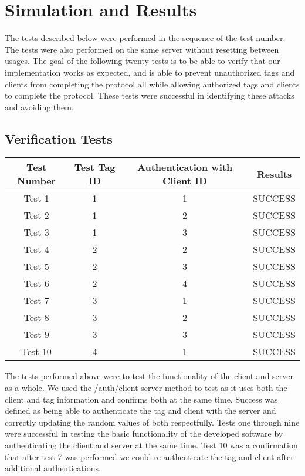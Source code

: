 \section{Simulation and Results}

The tests described below were performed in the sequence of the test number. The tests were also performed on the same server without resetting between usages. The goal of the following twenty tests is to be able to verify that our implementation works as expected, and is able to prevent unauthorized tags and clients from completing the protocol all while allowing authorized tags and clients to complete the protocol. These tests were successful in identifying these attacks and avoiding them.\\

\subsection{Verification Tests}
\begin{center}
    \begin{tabular}{|c|c|c|c|}
        \hline
        \textbf{Test Number} & \textbf{Test Tag ID} & \textbf{Authentication with Client ID} & \textbf{Results}\\
        \hline
        Test 1 & 1 & 1 & SUCCESS\\
        \hline
        Test 2 & 1 & 2 & SUCCESS\\
        \hline
        Test 3 & 1 & 3 & SUCCESS\\
        \hline
        Test 4 & 2 & 2 & SUCCESS\\
        \hline
        Test 5 & 2 & 3 & SUCCESS\\
        \hline
        Test 6 & 2 & 4 & SUCCESS\\
        \hline
        Test 7 & 3 & 1 & SUCCESS\\
        \hline
        Test 8 & 3 & 2 & SUCCESS\\
        \hline
        Test 9 & 3 & 3 & SUCCESS\\
        \hline
        Test 10 & 4 & 1 & SUCCESS\\
        \hline
    \end{tabular}
\end{center}

The tests performed above were to test the functionality of the client and server as a whole. We used the /auth/client server method to test as it uses both the client and tag information and confirms both at the same time. Success was defined as being able to authenticate the tag and client with the server and correctly updating the random values of both respectfully. Tests one through nine were successful in testing the basic functionality of the developed software by authenticating the client and server at the same time. Test 10 was a confirmation that after test 7 was performed we could re-authenticate the tag and client after additional authentications. 

